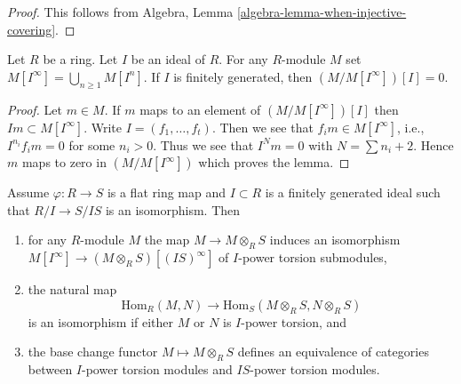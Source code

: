 \begin{proof}
This follows from
Algebra, Lemma \ref{algebra-lemma-when-injective-covering}.
\end{proof}

\begin{lemma}
\label{lemma-divide-by-torsion}
Let $R$ be a ring. Let $I$ be an ideal of $R$. For any $R$-module $M$
set $M[I^\infty] = \bigcup_{n \geq 1} M[I^n]$.
If $I$ is finitely generated, then $(M/M[I^\infty])[I] = 0$.
\end{lemma}

\begin{proof}
Let $m \in M$. If $m$ maps to an element of $(M/M[I^\infty])[I]$
then $Im \subset M[I^\infty]$.
Write $I = (f_1, \ldots, f_t)$. Then we see that
$f_i m \in M[I^\infty]$, i.e., $I^{n_i}f_i m = 0$ for some $n_i > 0$.
Thus we see that $I^Nm = 0$ with $N = \sum n_i + 2$.
Hence $m$ maps to zero in $(M/M[I^\infty])$ which proves the lemma.
\end{proof}

\begin{lemma}
\label{lemma-neighbourhood-equivalence}
Assume $\varphi : R \to S$ is a flat ring map and $I \subset R$ is a
finitely generated ideal such that $R/I \to S/IS$ is an isomorphism. Then
\begin{enumerate}
\item for any $R$-module $M$ the map $M \to M \otimes_R S$ induces
an isomorphism
$M[I^\infty] \to (M \otimes_R S)[(IS)^\infty]$ of $I$-power
torsion submodules,
\item the natural map
$$
\text{Hom}_R(M, N) \longrightarrow \text{Hom}_S(M \otimes_R S, N \otimes_R S)
$$
is an isomorphism if either $M$ or $N$ is $I$-power torsion, and
\item the base change functor $M \mapsto M \otimes_R S$ defines an
equivalence of categories between $I$-power torsion modules
and $IS$-power torsion modules.
\end{enumerate}
\end{lemma}


